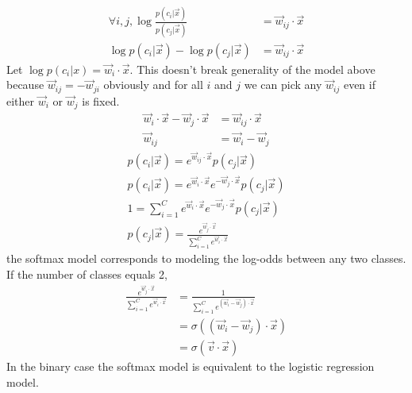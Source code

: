\documentclass{introtosml}
\newcommand{\x}{\vec{x}}
\newcommand{\w}{\vec{w}}
\begin{document}
\begin{p}
  \item
    \begin{align*}
      \forall i, j, \log \frac{p(c_i|\x)}{p(c_j|\x)} & = \w_{ij} \cdot \x \\
      \log p(c_i|\x) - \log p(c_j|\x) & = \w_{ij} \cdot \x
    \end{align*}
    Let $\log p(c_i|x) = \w_i \cdot \x$. This doesn't break generality
    of the model above because $\w_{ij} = - \w_{ji}$ obviously
    and for all $i$ and $j$ we can pick any $\w_{ij}$
    even if either $\w_i$ or $\w_j$ is fixed.
    \begin{align*}
      \w_i \cdot \x - \w_j \cdot \x & = \w_{ij} \cdot \x \\
      \w_{ij} & = \w_i - \w_j
    \end{align*}
    \begin{align*}
      p(c_i|\x) = e^{\w_{ij} \cdot \x} p(c_j|\x) \\
      p(c_i|\x) = e^{\w_i \cdot \x} e^{- \w_j \cdot \x} p(c_j|\x) \\
      1 = \sum_{i=1}^C e^{\w_i \cdot \x} e^{- \w_j \cdot \x} p(c_j|\x) \\
      p(c_j|\x) = \frac{e^{\w_j \cdot \x}}{\sum_{i=1}^C e^{\w_i \cdot \x}}
    \end{align*}
    \therefore the softmax model corresponds to modeling the log-odds
    between any two classes. \\
    If the number of classes equals 2,
    \begin{align*}
      \frac{e^{\w_j \cdot \x}}{\sum_{i=1}^C e^{\w_i \cdot \x}}
      & = \frac{1}{\sum_{i=1}^C e^{(\w_i - \w_j) \cdot \x}} \\
      & = \sigma((\w_i - \w_j) \cdot \x) \\
      & = \sigma(\vec{v} \cdot \x)
    \end{align*}
    \therefore In the binary case the softmax model is equivalent
    to the logistic regression model.


\end{p}
\end{document}
